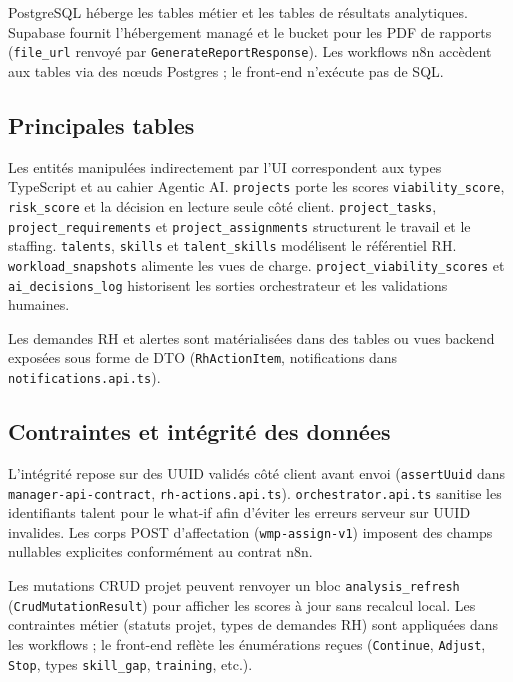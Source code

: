 PostgreSQL héberge les tables métier et les tables de résultats analytiques. Supabase fournit l'hébergement managé et le bucket pour les PDF de rapports (\texttt{file\_url} renvoyé par \texttt{GenerateReportResponse}). Les workflows n8n accèdent aux tables via des nœuds Postgres ; le front-end n'exécute pas de SQL.

\subsection{Principales tables}

Les entités manipulées indirectement par l'UI correspondent aux types TypeScript et au cahier Agentic AI. \texttt{projects} porte les scores \texttt{viability\_score}, \texttt{risk\_score} et la décision en lecture seule côté client. \texttt{project\_tasks}, \texttt{project\_requirements} et \texttt{project\_assignments} structurent le travail et le staffing. \texttt{talents}, \texttt{skills} et \texttt{talent\_skills} modélisent le référentiel RH. \texttt{workload\_snapshots} alimente les vues de charge. \texttt{project\_viability\_scores} et \texttt{ai\_decisions\_log} historisent les sorties orchestrateur et les validations humaines.

Les demandes RH et alertes sont matérialisées dans des tables ou vues backend exposées sous forme de DTO (\texttt{RhActionItem}, notifications dans \texttt{notifications.api.ts}).

\subsection{Contraintes et intégrité des données}

L'intégrité repose sur des UUID validés côté client avant envoi (\texttt{assertUuid} dans \texttt{manager-api-contract}, \texttt{rh-actions.api.ts}). \texttt{orchestrator.api.ts} sanitise les identifiants talent pour le what-if afin d'éviter les erreurs serveur sur UUID invalides. Les corps POST d'affectation (\texttt{wmp-assign-v1}) imposent des champs nullables explicites conformément au contrat n8n.

Les mutations CRUD projet peuvent renvoyer un bloc \texttt{analysis\_refresh} (\texttt{CrudMutationResult}) pour afficher les scores à jour sans recalcul local. Les contraintes métier (statuts projet, types de demandes RH) sont appliquées dans les workflows ; le front-end reflète les énumérations reçues (\texttt{Continue}, \texttt{Adjust}, \texttt{Stop}, types \texttt{skill\_gap}, \texttt{training}, etc.).

